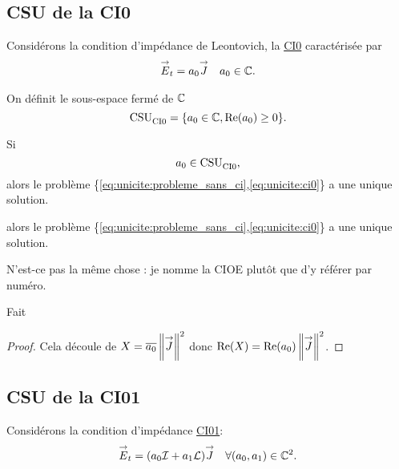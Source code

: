   \subsection{CSU de la CI0}
    Considérons la condition d’impédance de Leontovich, la \hyperlink{ci0}{CI0} caractérisée par
    \begin{align}
      \label{eq:unicite:ci0}
      {\overset{\rightarrow}{E}}_t = a_0 {\overset{\rightarrow}{J}} &&  a_0 \in \mathbb C.
    \end{align}

    \begin{defn}
      \label{def:csu:ci0}
      On définit le sous-espace fermé de \(\mathbb C\)
      \begin{equation*}
        \operatorname{CSU}_{\operatorname{CI0}}^{{}} = \lbrace a_0 \in \mathbb C, \operatorname{Re}(a_0) \ge 0 \rbrace.
      \end{equation*}
    \end{defn}

    \begin{prop}
      \label{prop:csu:ci0}
      Si
      \begin{equation*}
        a_0 \in \operatorname{CSU}_{\operatorname{CI0}}^{{}},
      \end{equation*}
      alors le problème \{\eqref{eq:unicite:probleme_sans_ci},\eqref{eq:unicite:ci0}\} a une unique solution.
      \begin{REM}
        alors le problème \{\eqref{eq:unicite:probleme_sans_ci},\eqref{eq:unicite:ci0}\} a une unique solution.
      \end{REM}
      \begin{REP}
      N'est-ce pas la même chose : je nomme la CIOE plutôt que d'y référer par numéro.
      \end{REP}
      \begin{REP}
      Fait
      \end{REP}
    \end{prop}
    \begin{proof}
      Cela découle de \( X = {\overline{a_0}}\left\lVert{\overset{\rightarrow}{J}}\right\rVert^2\) donc \(\operatorname{Re}(X) = \operatorname{Re}(a_0)\left\lVert{\overset{\rightarrow}{J}}\right\rVert^2 \).
    \end{proof}
  \subsection{CSU de la CI01}
    Considérons la condition d’impédance \hyperlink{ci01}{CI01}:
    \begin{align}
      \label{eq:unicite:ci01}
      {\overset{\rightarrow}{E}}_t = (a_0{\mathcal{I}} + a_1 \mathcal{L}){\overset{\rightarrow}{J}} && \forall (a_0, a_1) \in \mathbb C^2.
    \end{align}

